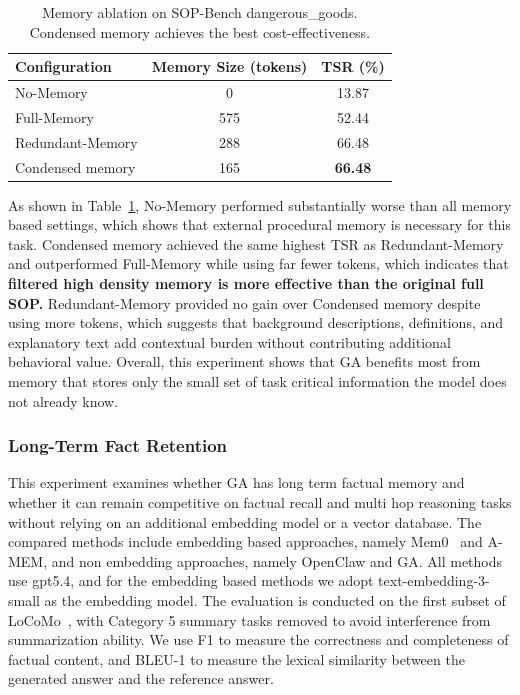 \begin{table}[t]
\centering
\caption{Memory ablation on SOP-Bench dangerous\_goods. Condensed memory achieves the best cost-effectiveness.}
\label{tab:memory_ablation}
\begin{tabular}{lcc}
\toprule
\textbf{Configuration} & \textbf{Memory Size (tokens)} & \textbf{TSR (\%)} \\
\midrule
No-Memory & 0 & 13.87 \\
Full-Memory & 575 & 52.44 \\
Redundant-Memory & 288 & 66.48 \\
Condensed memory & 165 & \textbf{66.48} \\
\bottomrule
\end{tabular}
\end{table}

As shown in Table~\ref{tab:memory_ablation}, No-Memory performed substantially worse than all memory based settings, which shows that external procedural memory is necessary for this task. 
Condensed memory achieved the same highest TSR as Redundant-Memory and outperformed Full-Memory while using far fewer tokens, which indicates that \textbf{filtered high density memory is more effective than the original full SOP. }
Redundant-Memory provided no gain over Condensed memory despite using more tokens, which suggests that background descriptions, definitions, and explanatory text add contextual burden without contributing additional behavioral value. 
Overall, this experiment shows that GA benefits most from memory that stores only the small set of task critical information the model does not already know.

\subsubsection{Long-Term Fact Retention}
\label{sec:exp_longterm_fact}

This experiment examines whether GA has long term factual memory and whether it can remain competitive on factual recall and multi hop reasoning tasks without relying on an additional embedding model or a vector database. 
The compared methods include embedding based approaches, namely Mem0~\citep{mem0} and A-MEM, and non embedding approaches, namely OpenClaw and GA. 
All methods use gpt5.4, and for the embedding based methods we adopt text-embedding-3-small as the embedding model. 
The evaluation is conducted on the first subset of LoCoMo~\citep{locomo}, with Category 5 summary tasks removed to avoid interference from summarization ability.
We use F1 to measure the correctness and completeness of factual content, and BLEU-1 to measure the lexical similarity between the generated answer and the reference answer.

